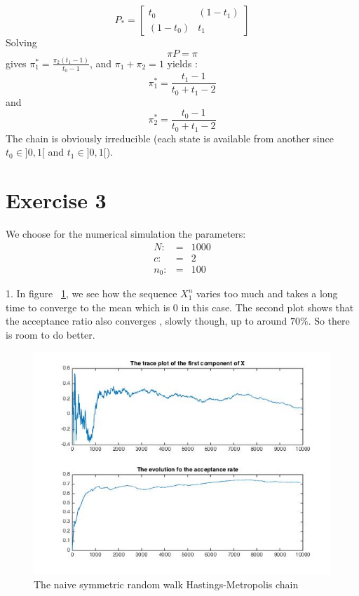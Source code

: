 	$$P_{*}= \begin{bmatrix} t_0 & (1-t_1) \\ (1-t_0) & t_1 \end{bmatrix}$$
	Solving 
	$$ \pi P = \pi $$ 
	gives $\pi^{*}_1=\frac{\pi_2(t_1-1)}{t_0-1}$, and $\pi_1 + \pi_2 = 1 $ yields :
	$$\boxed{\pi^{*}_1 = \frac{t_1-1}{t_0+t_1 -2}}$$
	and
	$$\boxed{\pi^{*}_2 = \frac{t_0-1}{t_0+t_1-2}}$$
	The chain is obviously irreducible (each state is available from another since $t_0 \in ]0,1[$  and $t_1 \in ]0,1[$).
	
	\section*{Exercise 3}
	We choose for the numerical simulation the parameters:
	\begin{eqnarray*}
		N :&=&1000\\
		c :&=&2\\
		n_0 :&=&100
	\end{eqnarray*}
	
	1.  In figure ~\ref{nrwHM}, we see how the sequence $X^n_1$ varies too much and takes a long time to converge to the mean which is $0$ in this case. The second plot shows that the acceptance ratio also converges , slowly though, up to around $70\%$. So there is room to do better.
	\begin{figure}
		\centering
		\includegraphics[scale=.5]{nrwHM}
		\caption{The naive symmetric random walk Hastings-Metropolis chain}
		\label{nrwHM}
	\end{figure}
	~\\
	
